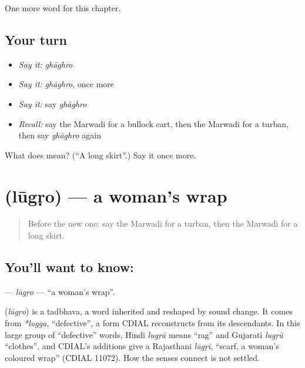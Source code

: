 \begin{grammarlens}[title={What you've built}]
One more word for this chapter.
\end{grammarlens}

\subsection*{Your turn}
\begin{itemize}
\raggedright
  \item \emph{Say it:} \emph{ghāghro}
  \item \emph{Say it:} \emph{ghāghro}, once more
  \item \emph{Say it:} say \emph{ghāghro}
  \item \emph{Recall:} say the Marwadi for a bullock cart, then the Marwadi for a turban, then say \emph{ghāghro} again
\end{itemize}

\begin{tcolorbox}[breakable,colback=teal!4,colframe=teal!35!black,title={Before you move on}]
What does  mean? (\textquotedblleft{}A long skirt\textquotedblright{}.) Say it once more.
\end{tcolorbox}
\section[\texorpdfstring{\mw{लूगड़ो} (lūgṛo)}{लूगड़ो (lūgṛo)}]{ (lūgṛo) — a woman's wrap}

\label{lesson:MW-C128-lugro}



\begin{quote}
Before the new one: say the Marwadi for a turban, then the Marwadi for a long skirt.
\end{quote}

\subsection*{You'll want to know: }
\textbf{} — \emph{lūgṛo} — \textquotedblleft{}a woman's wrap\textquotedblright{}.

\begin{cousinweb}
\textbf{} (\emph{lūgṛo}) is a tadbhava, a word inherited and reshaped by sound change. It comes from \emph{*lugga}, \textquotedblleft{}defective\textquotedblright{}, a form CDIAL reconstructs from its descendants. In this large group of \textquotedblleft{}defective\textquotedblright{} words, Hindi \emph{lugṛā} means \textquotedblleft{}rag\textquotedblright{} and Gujarati \emph{lugṛũ} \textquotedblleft{}clothes\textquotedblright{}, and CDIAL's additions give a Rajasthani \emph{lūgṛī}, \textquotedblleft{}scarf, a woman's coloured wrap\textquotedblright{} (CDIAL 11072). How the senses connect is not settled.
\end{cousinweb}

